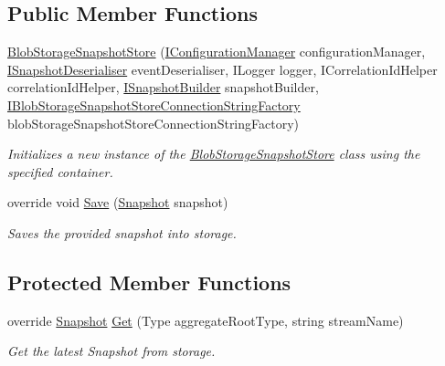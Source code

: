 \subsection*{Public Member Functions}
\begin{DoxyCompactItemize}
\item 
\hyperlink{classCqrs_1_1Azure_1_1BlobStorage_1_1Events_1_1BlobStorageSnapshotStore_ac0e7a4428f17d4734de77261d1c6669d_ac0e7a4428f17d4734de77261d1c6669d}{Blob\+Storage\+Snapshot\+Store} (\hyperlink{interfaceCqrs_1_1Configuration_1_1IConfigurationManager}{I\+Configuration\+Manager} configuration\+Manager, \hyperlink{interfaceCqrs_1_1Events_1_1ISnapshotDeserialiser}{I\+Snapshot\+Deserialiser} event\+Deserialiser, I\+Logger logger, I\+Correlation\+Id\+Helper correlation\+Id\+Helper, \hyperlink{interfaceCqrs_1_1Events_1_1ISnapshotBuilder}{I\+Snapshot\+Builder} snapshot\+Builder, \hyperlink{interfaceCqrs_1_1Azure_1_1BlobStorage_1_1IBlobStorageSnapshotStoreConnectionStringFactory}{I\+Blob\+Storage\+Snapshot\+Store\+Connection\+String\+Factory} blob\+Storage\+Snapshot\+Store\+Connection\+String\+Factory)
\begin{DoxyCompactList}\small\item\em Initializes a new instance of the \hyperlink{classCqrs_1_1Azure_1_1BlobStorage_1_1Events_1_1BlobStorageSnapshotStore}{Blob\+Storage\+Snapshot\+Store} class using the specified container. \end{DoxyCompactList}\item 
override void \hyperlink{classCqrs_1_1Azure_1_1BlobStorage_1_1Events_1_1BlobStorageSnapshotStore_afb32196428d4c92c9542a94a1764fa59_afb32196428d4c92c9542a94a1764fa59}{Save} (\hyperlink{classCqrs_1_1Snapshots_1_1Snapshot}{Snapshot} snapshot)
\begin{DoxyCompactList}\small\item\em Saves the provided {\itshape snapshot}  into storage. \end{DoxyCompactList}\end{DoxyCompactItemize}
\subsection*{Protected Member Functions}
\begin{DoxyCompactItemize}
\item 
override \hyperlink{classCqrs_1_1Snapshots_1_1Snapshot}{Snapshot} \hyperlink{classCqrs_1_1Azure_1_1BlobStorage_1_1Events_1_1BlobStorageSnapshotStore_a0d5d8af1e7e243d05ccc064b532bee2b_a0d5d8af1e7e243d05ccc064b532bee2b}{Get} (Type aggregate\+Root\+Type, string stream\+Name)
\begin{DoxyCompactList}\small\item\em Get the latest Snapshot from storage. \end{DoxyCompactList}\end{DoxyCompactItemize}
